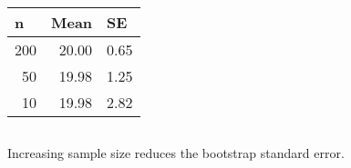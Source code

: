 \subsection{}

\begin{table}[!ht]
\centering	
\begin{tabular}{@{}rrr@{}}
\toprule
\multicolumn{1}{l}{n} & \multicolumn{1}{l}{Mean} & \multicolumn{1}{l}{SE} \\ \midrule
200                   & 20.00                    & 0.65                   \\
50                    & 19.98                    & 1.25                   \\
10                    & 19.98                    & 2.82                   \\ \bottomrule
\end{tabular}
\end{table}

\subsection{}
Increasing sample size reduces the bootstrap standard error.